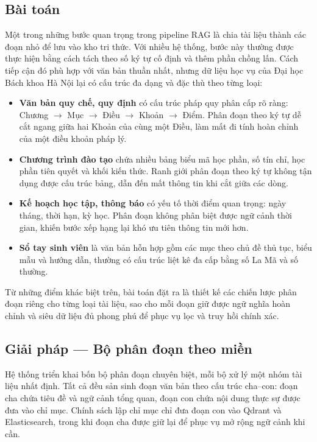 \documentclass[../DoAn.tex]{subfiles}
\begin{document}
\subsection{Bài toán}

Một trong những bước quan trọng trong pipeline RAG là chia tài liệu thành các
đoạn nhỏ để lưu vào kho tri thức. Với nhiều hệ thống, bước này thường được thực
hiện bằng cách tách theo số ký tự cố định và thêm phần chồng lấn. Cách tiếp
cận đó phù hợp với văn bản thuần nhất, nhưng dữ liệu học vụ của Đại học Bách
khoa Hà Nội lại có cấu trúc đa dạng và đặc thù theo từng loại:

\begin{itemize}
    \item \textbf{Văn bản quy chế, quy định} có cấu trúc pháp quy phân cấp rõ
    ràng: Chương $\to$ Mục $\to$ Điều $\to$ Khoản $\to$ Điểm. Phân đoạn theo
    ký tự dễ cắt ngang giữa hai Khoản của cùng một Điều, làm mất đi tính hoàn
    chỉnh của một điều khoản pháp lý.
    \item \textbf{Chương trình đào tạo} chứa nhiều bảng biểu mã học phần, số
    tín chỉ, học phần tiên quyết và khối kiến thức. Ranh giới phân đoạn theo ký
    tự không tận dụng được cấu trúc bảng, dẫn đến mất thông tin khi cắt giữa
    các dòng.
    \item \textbf{Kế hoạch học tập, thông báo} có yếu tố thời điểm quan trọng:
    ngày tháng, thời hạn, kỳ học. Phân đoạn không phân biệt được ngữ cảnh thời
    gian, khiến bước xếp hạng lại khó ưu tiên thông tin mới hơn.
    \item \textbf{Sổ tay sinh viên} là văn bản hỗn hợp gồm các mục theo chủ đề
    thủ tục, biểu mẫu và hướng dẫn, thường có cấu trúc liệt kê đa cấp bằng số
    La Mã và số thường.
\end{itemize}

Từ những điểm khác biệt trên, bài toán đặt ra là thiết kế các chiến lược phân
đoạn riêng cho từng loại tài liệu, sao cho mỗi đoạn giữ được ngữ nghĩa hoàn
chỉnh và siêu dữ liệu đủ phong phú để phục vụ lọc và truy hồi chính xác.

\subsection{Giải pháp --- Bộ phân đoạn theo miền}

Hệ thống triển khai bốn bộ phân đoạn chuyên biệt, mỗi bộ xử lý một nhóm tài
liệu nhất định. Tất cả đều sản sinh đoạn văn bản theo cấu trúc cha--con: đoạn
cha chứa tiêu đề và ngữ cảnh tổng quan, đoạn con chứa nội dung thực sự được
đưa vào chỉ mục. Chính sách lập chỉ mục chỉ đưa đoạn con vào Qdrant và
Elasticsearch, trong khi đoạn cha được giữ lại để phục vụ mở rộng ngữ cảnh khi
cần.
\end{document}
